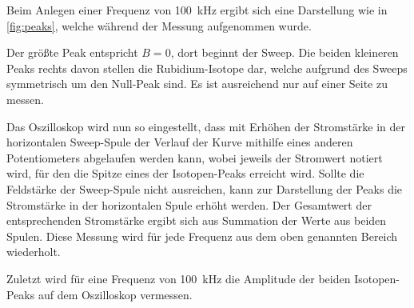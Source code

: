     Beim Anlegen einer Frequenz von \SI{100}{\kilo\hertz} ergibt sich eine Darstellung wie in \autoref{fig:peaks},
    welche während der Messung aufgenommen wurde.

    Der größte Peak entspricht $B = 0$,
    dort beginnt der Sweep.
    Die beiden kleineren Peaks rechts davon stellen die Rubidium-Isotope dar,
    welche aufgrund des Sweeps symmetrisch um den Null-Peak sind.
    Es ist ausreichend nur auf einer Seite zu messen.

    Das Oszilloskop wird nun so eingestellt,
    dass mit Erhöhen der Stromstärke in der horizontalen Sweep-Spule der Verlauf der Kurve mithilfe eines anderen Potentiometers abgelaufen werden kann,
    wobei jeweils der Stromwert notiert wird,
    für den die Spitze eines der Isotopen-Peaks erreicht wird.
    Sollte die Feldstärke der Sweep-Spule nicht ausreichen,
    kann zur Darstellung der Peaks die Stromstärke in der horizontalen Spule erhöht werden.
    Der Gesamtwert der entsprechenden Stromstärke ergibt sich aus Summation der Werte aus beiden Spulen.
    Diese Messung wird für jede Frequenz aus dem oben genannten Bereich wiederholt.

    Zuletzt wird für eine Frequenz von \SI{100}{\kilo\hertz} die Amplitude der beiden Isotopen-Peaks auf dem Oszilloskop vermessen.
